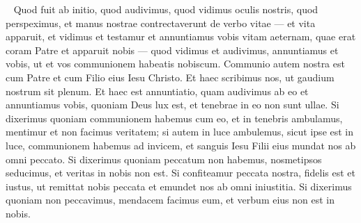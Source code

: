 
\begin{biblechapter}  
\verse Quod fuit ab initio, quod audivimus, quod vidimus oculis nostris, quod perspeximus, et manus nostrae contrectaverunt de verbo vitae 
\verse — et vita apparuit, et vidimus et testamur et annuntiamus vobis vitam aeternam, quae erat coram Patre et apparuit nobis — 
\verse quod vidimus et audivimus, annuntiamus et vobis, ut et vos communionem habeatis nobiscum. Communio autem nostra est cum Patre et cum Filio eius Iesu Christo. 
\verse Et haec scribimus nos, ut gaudium nostrum sit plenum.  
\verse Et haec est annuntiatio, quam audivimus ab eo et annuntiamus vobis, quoniam Deus lux est, et tenebrae in eo non sunt ullae. 
\verse Si dixerimus quoniam communionem habemus cum eo, et in tenebris ambulamus, mentimur et non facimus veritatem; 
\verse si autem in luce ambulemus, sicut ipse est in luce, communionem habemus ad invicem, et sanguis Iesu Filii eius mundat nos ab omni peccato. 
\verse Si dixerimus quoniam peccatum non habemus, nosmetipsos seducimus, et veritas in nobis non est. 
\verse Si confiteamur peccata nostra, fidelis est et iustus, ut remittat nobis peccata et emundet nos ab omni iniustitia. 
\verse Si dixerimus quoniam non peccavimus, mendacem facimus eum, et verbum eius non est in nobis. 
\end{biblechapter}


